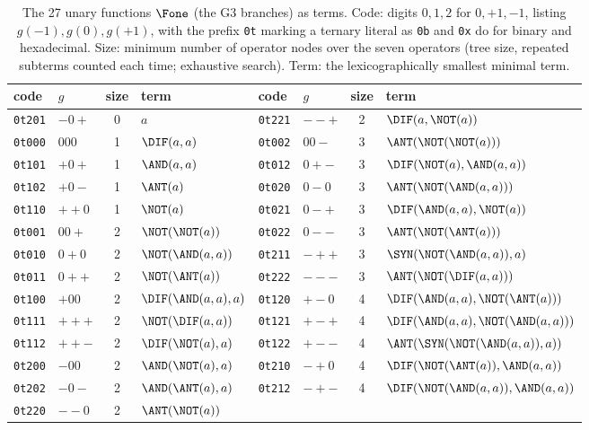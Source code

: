 \begin{table}[t]
\centering\scriptsize
\setlength{\tabcolsep}{3pt}
\caption{The 27 unary functions $\Fone$ (the G3 branches) as \bidra{} terms. Code: digits $0,1,2$ for $0,+1,-1$, listing $g(-1),g(0),g(+1)$, with the prefix \texttt{0t} marking a ternary literal as \texttt{0b} and \texttt{0x} do for binary and hexadecimal. Size: minimum number of operator nodes over the seven operators (tree size, repeated subterms counted each time; exhaustive search). Term: the lexicographically smallest minimal term.}
\label{tab:unary}
\begin{tabular}{llcl@{\hspace{1.2em}}llcl}
\toprule
code & $g$ & size & term & code & $g$ & size & term\\\midrule
\texttt{0t201} & $-0+$ & 0 & $a$ & \texttt{0t221} & $--+$ & 2 & $\DIF(a,\NOT(a))$\\
\texttt{0t000} & $000$ & 1 & $\DIF(a,a)$ & \texttt{0t002} & $00-$ & 3 & $\ANT(\NOT(\NOT(a)))$\\
\texttt{0t101} & $+0+$ & 1 & $\AND(a,a)$ & \texttt{0t012} & $0+-$ & 3 & $\DIF(\NOT(a),\AND(a,a))$\\
\texttt{0t102} & $+0-$ & 1 & $\ANT(a)$ & \texttt{0t020} & $0-0$ & 3 & $\ANT(\NOT(\AND(a,a)))$\\
\texttt{0t110} & $++0$ & 1 & $\NOT(a)$ & \texttt{0t021} & $0-+$ & 3 & $\DIF(\AND(a,a),\NOT(a))$\\
\texttt{0t001} & $00+$ & 2 & $\NOT(\NOT(a))$ & \texttt{0t022} & $0--$ & 3 & $\ANT(\NOT(\ANT(a)))$\\
\texttt{0t010} & $0+0$ & 2 & $\NOT(\AND(a,a))$ & \texttt{0t211} & $-++$ & 3 & $\SYN(\NOT(\AND(a,a)),a)$\\
\texttt{0t011} & $0++$ & 2 & $\NOT(\ANT(a))$ & \texttt{0t222} & $---$ & 3 & $\ANT(\NOT(\DIF(a,a)))$\\
\texttt{0t100} & $+00$ & 2 & $\DIF(\AND(a,a),a)$ & \texttt{0t120} & $+-0$ & 4 & $\DIF(\AND(a,a),\NOT(\ANT(a)))$\\
\texttt{0t111} & $+++$ & 2 & $\NOT(\DIF(a,a))$ & \texttt{0t121} & $+-+$ & 4 & $\DIF(\AND(a,a),\NOT(\AND(a,a)))$\\
\texttt{0t112} & $++-$ & 2 & $\DIF(\NOT(a),a)$ & \texttt{0t122} & $+--$ & 4 & $\ANT(\SYN(\NOT(\AND(a,a)),a))$\\
\texttt{0t200} & $-00$ & 2 & $\AND(\NOT(a),a)$ & \texttt{0t210} & $-+0$ & 4 & $\DIF(\NOT(\ANT(a)),\AND(a,a))$\\
\texttt{0t202} & $-0-$ & 2 & $\AND(\ANT(a),a)$ & \texttt{0t212} & $-+-$ & 4 & $\DIF(\NOT(\AND(a,a)),\AND(a,a))$\\
\texttt{0t220} & $--0$ & 2 & $\ANT(\NOT(a))$ &  &  &  & \\
\bottomrule
\end{tabular}
\end{table}
